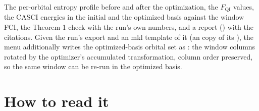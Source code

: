The per-orbital entropy profile before and after the optimization, the
$F_{\mathrm{QI}}$ values, the CASCI energies in the initial and the optimized
basis against the window FCI, the Theorem-1 check with the run's own numbers,
and a report () with the citations.  Given the
run's  export and an mkl template of it (an
 copy of its ), the menu additionally writes the
optimized-basis orbital set as : the window
columns rotated by the optimizer's accumulated transformation, column order
preserved, so the same window can be re-run in the optimized basis.

\section{How to read it}

